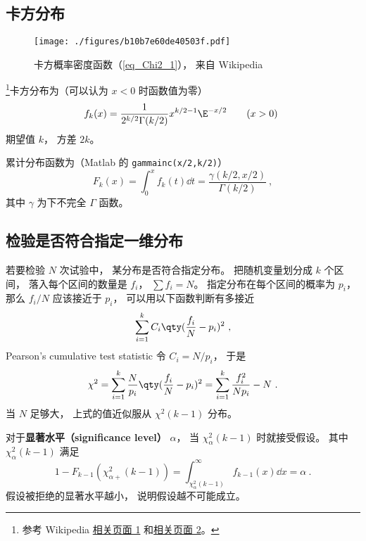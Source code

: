 
\begin{issues}
\issueDraft
\end{issues}

\subsection{卡方分布}
\begin{figure}[ht]
\centering
\texttt{[image: ./figures/b10b7e60de40503f.pdf]}
\caption{卡方概率密度函数（\autoref{eq_Chi2_1}）， 来自 Wikipedia} \label{fig_Chi2_1}
\end{figure}

\footnote{参考 Wikipedia \href{https://en.wikipedia.org/wiki/Chi-squared_distribution}{相关页面 1} 和\href{https://en.wikipedia.org/wiki/Pearson's_chi-squared_test}{相关页面 2}。}卡方分布为（可以认为 $x<0$ 时函数值为零）
\begin{equation}\label{eq_Chi2_1}
f_k(x) = \frac{1}{2^{k/2}\Gamma(k/2)}x^{k/2-1}\E^{-x/2} \qquad (x > 0)~
\end{equation}
期望值 $k$， 方差 $2k$。

累计分布函数为（Matlab 的 \verb|gammainc(x/2,k/2)|）
\begin{equation}
F_k(x) = \int_0^{x} f_k(t) \dd{t} = \frac{\gamma(k/2, x/2)}{\Gamma(k/2)}~,
\end{equation}
其中 $\gamma$ 为下不完全 $\Gamma$ 函数。

\subsection{检验是否符合指定一维分布}
若要检验 $N$ 次试验中， 某分布是否符合指定分布。 把随机变量划分成 $k$ 个区间， 落入每个区间的数量是 $f_i$， $\sum f_i = N$。 指定分布在每个区间的概率为 $p_i$， 那么 $f_i/N$ 应该接近于 $p_i$， 可以用以下函数判断有多接近
\begin{equation}
\sum_{i=1}^k C_i \qty(\frac{f_i}{N} - p_i)^2~,
\end{equation}
Pearson's cumulative test statistic 令 $C_i = N/p_i$， 于是
\begin{equation}
\chi^2 = \sum_{i=1}^k \frac{N}{p_i} \qty(\frac{f_i}{N} - p_i)^2 = \sum_{i=1}^k \frac{f_i^2}{Np_i} - N~.
\end{equation}
当 $N$ 足够大， 上式的值近似服从 $\chi^2(k-1)$ 分布。

对于\textbf{显著水平（significance level）} $\alpha$， 当 $\chi_{\alpha}^2(k-1)$ 时就接受假设。 其中 $\chi_{\alpha}^2(k-1)$ 满足
\begin{equation}
1 - F_{k-1}(\chi_{\alpha+}^2(k-1)) = \int_{\chi_{\alpha}^2(k-1)}^\infty f_{k-1}(x) \dd{x} = \alpha~.
\end{equation}
假设被拒绝的显著水平越小， 说明假设越不可能成立。

